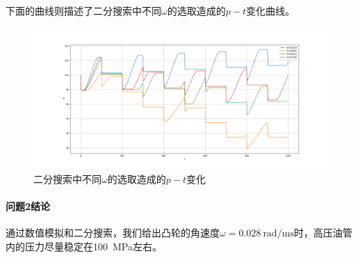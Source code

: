 \documentclass[12pt,AutoFakeBold]{article}%
\begin{document}
    下面的曲线则描述了二分搜索中不同$\omega$的选取造成的$p-t$变化曲线。
    \begin{figure}[H]
        \centering
        \includegraphics[scale=0.32]{figure/3-2.png}
        \caption{二分搜索中不同$\omega$的选取造成的$p-t$变化}
    \end{figure}
    \paragraph{问题2结论}
    通过数值模拟和二分搜索，我们给出凸轮的角速度$\omega=\SI{0.028}{\radian\per\ms}$时，高压油管内的压力尽量稳定在\SI{100}{\MPa}左右。
\end{document}
